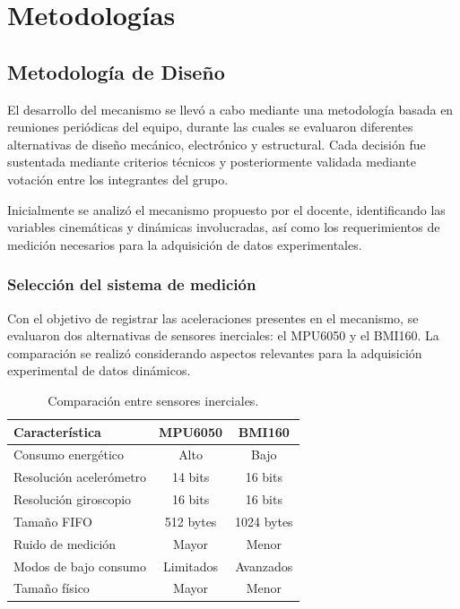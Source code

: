 \section{Metodologías}
\subsection{Metodología de Diseño}

El desarrollo del mecanismo se llevó a cabo mediante una metodología  basada en reuniones periódicas del equipo, durante las cuales se evaluaron diferentes alternativas de diseño mecánico, electrónico y estructural. Cada decisión fue sustentada mediante criterios técnicos y posteriormente validada mediante votación entre los integrantes del grupo.

Inicialmente se analizó el mecanismo propuesto por el docente, identificando las variables cinemáticas y dinámicas involucradas, así como los requerimientos de medición necesarios para la adquisición de datos experimentales.

\subsubsection{Selección del sistema de medición}

Con el objetivo de registrar las aceleraciones presentes en el mecanismo, se evaluaron dos alternativas de sensores inerciales: el MPU6050 y el BMI160. La comparación se realizó considerando aspectos relevantes para la adquisición experimental de datos dinámicos.

\begin{table}[H]
\centering
\caption{Comparación entre sensores inerciales.}
\begin{tabularx}{\columnwidth}{|X|c|c|}
\hline
\rowcolor{gray!20}
Característica & MPU6050 & BMI160\\
\hline
Consumo energético & Alto & Bajo\\
Resolución acelerómetro & 14 bits & 16 bits\\
Resolución giroscopio & 16 bits & 16 bits\\
Tamaño FIFO & 512 bytes & 1024 bytes\\
Ruido de medición & Mayor & Menor\\
Modos de bajo consumo & Limitados & Avanzados\\
Tamaño físico & Mayor & Menor\\
\hline
\end{tabularx}
\end{table}

